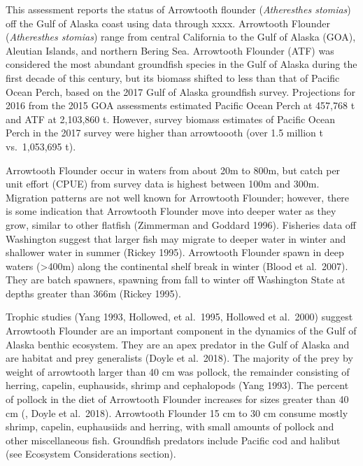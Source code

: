 \documentclass[11pt,
  english,
  a4paper,
]{article}
\begin{document}
\leavevmode\tagmcend\tagstructend


This assessment reports the status of Arrowtooth flounder (\emph{Atheresthes stomias}) off the Gulf of Alaska coast using data through xxxx. Arrowtooth Flounder (\emph{Atheresthes stomias}) range from central California to the Gulf of Alaska (GOA), Aleutian Islands, and northern Bering Sea. Arrowtooth Flounder (ATF) was considered the most abundant groundfish species in the Gulf of Alaska during the first decade of this century, but its biomass shifted to less than that of Pacific Ocean Perch, based on the 2017 Gulf of Alaska groundfish survey. Projections for 2016 from the 2015 GOA assessments estimated Pacific Ocean Perch at 457,768 t and ATF at 2,103,860 t. However, survey biomass estimates of Pacific Ocean Perch in the 2017 survey were higher than arrowtoooth (over 1.5 million t vs.~1,053,695 t).

\leavevmode\tagmcend\tagstructend\par


Arrowtooth Flounder occur in waters from about 20m to 800m, but catch per unit effort (CPUE) from survey data is highest between 100m and 300m. Migration patterns are not well known for Arrowtooth Flounder; however, there is some indication that Arrowtooth Flounder move into deeper water as they grow, similar to other flatfish (Zimmerman and Goddard 1996). Fisheries data off Washington suggest that larger fish may migrate to deeper water in winter and shallower water in summer (Rickey 1995). Arrowtooth Flounder spawn in deep waters (\textgreater400m) along the continental shelf break in winter (Blood et al.~2007). They are batch spawners, spawning from fall to winter off Washington State at depths greater than 366m (Rickey 1995).

\leavevmode\tagmcend\tagstructend\par


Trophic studies (Yang 1993, Hollowed, et al.~1995, Hollowed et al.~2000) suggest Arrowtooth Flounder are an important component in the dynamics of the Gulf of Alaska benthic ecosystem. They are an apex predator in the Gulf of Alaska and are habitat and prey generalists (Doyle et al.~2018). The majority of the prey by weight of arrowtooth larger than 40 cm was pollock, the remainder consisting of herring, capelin, euphausids, shrimp and cephalopods (Yang 1993). The percent of pollock in the diet of Arrowtooth Flounder increases for sizes greater than 40 cm (, Doyle et al.~2018). Arrowtooth Flounder 15 cm to 30 cm consume mostly shrimp, capelin, euphausiids and herring, with small amounts of pollock and other miscellaneous fish. Groundfish predators include Pacific cod and halibut (see Ecosystem Considerations section).
\end{document}
